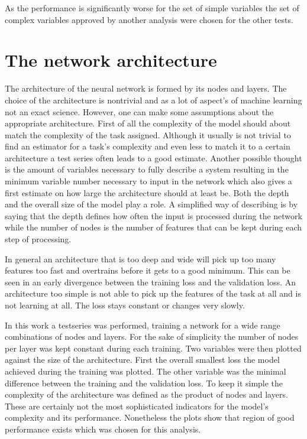 As the performance is significantly worse for the set of simple variables the set of complex variables approved by another analysis were chosen for the other tests.



\section{The network architecture}

The architecture of the neural network is formed by its nodes and layers. The choice of the architecture is nontrivial and as a lot of aspect's of machine learning not an exact science.
However, one can make some assumptions about the appropriate architecture.
First of all the complexity of the model should about match the complexity of the task assigned. Although it usually is not trivial to find an estimator for a task's complexity and even less to match it to a certain architecture a test series often leads to a good estimate. Another possible thought is the amount of variables necessary to fully describe a system resulting in the minimum variable number necessary to input in the network which also gives a first estimate on how large the architecture should at least be.
Both the depth and the overall size of the model play a role. A simplified way of describing is by saying that the depth defines how often the input is processed during the network while the number of nodes is the number of features that can be kept during each step of processing.

In general an architecture that is too deep and wide will pick up too many features too fast and overtrains before it gets to a good minimum. This can be seen in an early divergence between the training loss and the validation loss. An architecture too simple is not able to pick up the features of the task at all and is not learning at all. The loss stays constant or changes very slowly.

In this work a testseries was performed, training a network for a wide range combinations of nodes and layers. For the sake of simplicity the number of nodes per layer was kept constant during each training. Two variables were then plotted against the size of the architecture. First the overall smallest loss the model achieved during the training was plotted. The other variable was the minimal difference between the training and the validation loss. To keep it simple the complexity of the architecture was defined as the product of nodes and layers. These are certainly not the most sophisticated indicators for the model's complexity and its performance. Nonetheless the plots show that region of good performance exists which was chosen for this analysis.

